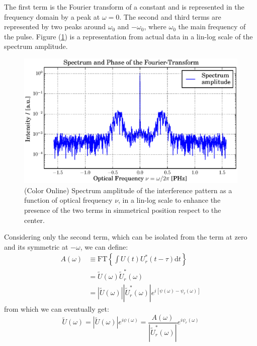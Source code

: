 \documentclass[12pt,a4paper,twoside]{article}
\begin{document}
The first term is the Fourier transform of a constant and is represented in the frequency domain by a peak at $\omega = 0$.
The second and third terms are represented by two peaks around $\omega_0$ and $-\omega_0$, where $\omega_0$ the main frequency of the pulse.
Figure (\ref{fig_spectrum}) is a representation from actual data in a lin-log scale of the spectrum amplitude.

\begin{figure}[h!]
	\centering
	\includegraphics[scale=.9]{data/spectrum_linlog.eps}
	\caption{(Color Online) Spectrum amplitude of the interference pattern as a function of optical frequency $\nu$, in a lin-log scale to enhance the presence of the two terms in simmetrical position respect to the center.}
	\label{fig_spectrum}
\end{figure}

Considering only the second term, which can be isolated from the term at zero and its symmetric at $-\omega$, we can define:
\begin{align}
	A(\omega) 	&\equiv \mathrm{FT} \left\lbrace \int U(t)U_r^*(t-\tau)\mathrm{d}t \right\rbrace \\
				&= \tilde{U}(\omega)\tilde{U}_r^*(\omega) \nonumber\\
				&= |\tilde{U}(\omega)||\tilde{U}_r^*(\omega)|e^{i[\psi(\omega)-\psi_r(\omega)]}
\end{align}
from which we can eventually get:
\begin{equation}
	\tilde{U}(\omega) = |\tilde{U}(\omega)|e^{i\psi(\omega)} = \frac{A(\omega)}{|\tilde{U}_r^*(\omega)|}e^{i\psi_r(\omega)}
	\label{eq_complex_mono_w}
\end{equation}
\end{document}
